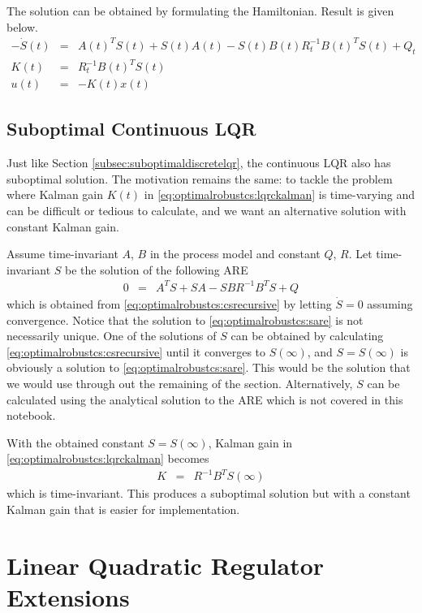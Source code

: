 The solution can be obtained by formulating the Hamiltonian. Result is given below.
\begin{eqnarray}
  -\dot{S}(t) &=& A(t)^TS(t) + S(t)A(t) - S(t)B(t)R_t^{-1}B(t)^TS(t) + Q_t \label{eq:optimalrobustcs:csrecursive} \\
  K(t) &=& R_t^{-1}B(t)^TS(t) \label{eq:optimalrobustcs:lqrckalman} \\
  u(t) &=& -K(t)x(t) \nonumber 
\end{eqnarray}

\subsection{Suboptimal Continuous LQR}

Just like Section \ref{subsec:suboptimaldiscretelqr}, the continuous LQR also has suboptimal solution. The motivation remains the same: to tackle the problem where Kalman gain $K(t)$ in \eqref{eq:optimalrobustcs:lqrckalman} is time-varying and can be difficult or tedious to calculate, and we want an alternative solution with constant Kalman gain.

Assume time-invariant $A$, $B$ in the process model and constant $Q$, $R$. Let time-invariant $S$ be the solution of the following ARE
\begin{eqnarray}
	0 &=& A^TS + SA - SBR^{-1}B^TS + Q \label{eq:optimalrobustcs:sare}
\end{eqnarray}
which is obtained from \eqref{eq:optimalrobustcs:csrecursive} by letting $\dot{S}=0$ assuming convergence. Notice that the solution to \eqref{eq:optimalrobustcs:sare} is not necessarily unique. One of the solutions of $S$ can be obtained by calculating \eqref{eq:optimalrobustcs:csrecursive} until it converges to $S(\infty)$, and $S=S(\infty)$ is obviously a solution to \eqref{eq:optimalrobustcs:sare}. This would be the solution that we would use through out the remaining of the section. Alternatively, $S$ can be calculated using the analytical solution to the ARE which is not covered in this notebook.

With the obtained constant $S=S(\infty)$, Kalman gain in \eqref{eq:optimalrobustcs:lqrckalman} becomes
\begin{eqnarray}
	K &=& R^{-1}B^TS(\infty) \nonumber
\end{eqnarray}
which is time-invariant. This produces a suboptimal solution but with a constant Kalman gain that is easier for implementation.

\section{Linear Quadratic Regulator Extensions}

